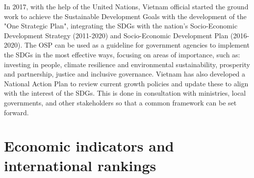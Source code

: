\documentclass[openany]{book}
\begin{document}
In 2017, with the help of the United Nations, Vietnam official started the ground work to achieve the Sustainable Development Goals with the development of the "One Strategic Plan",\cite{140} integrating the SDGs with the nation's Socio-Economic Development Strategy (2011-2020) and Socio-Economic Development Plan (2016-2020). The OSP can be used as a guideline for government agencies to implement the SDGs in the most effective ways, focusing on areas of importance, such as: investing in people, climate resilience and environmental sustainability, prosperity and partnership, justice and inclusive governance. Vietnam has also developed a National Action Plan to review current growth policies and update these to align with the interest of the SDGs. This is done in consultation with ministries, local governments, and other stakeholders so that a common framework can be set forward.

\chapter{Economic indicators and international rankings}
\end{document}
